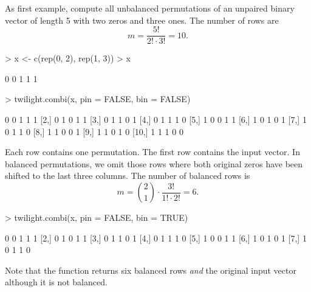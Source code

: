 \documentclass[11pt,a4paper,fleqn]{report}
\begin{document}
As first example, compute all unbalanced permutations of an unpaired binary vector of length 5 with two zeros and three ones. The number of rows are 
\begin{equation}
m = \frac{5!}{2! \cdot 3!} = 10.
\end{equation}
\begin{Schunk}
\begin{Sinput}
> x <- c(rep(0, 2), rep(1, 3))
> x
\end{Sinput}
\begin{Soutput}
[1] 0 0 1 1 1
\end{Soutput}
\end{Schunk}
\begin{Schunk}
\begin{Sinput}
> twilight.combi(x, pin = FALSE, bin = FALSE)
\end{Sinput}
\begin{Soutput}
      [,1] [,2] [,3] [,4] [,5]
 [1,]    0    0    1    1    1
 [2,]    0    1    0    1    1
 [3,]    0    1    1    0    1
 [4,]    0    1    1    1    0
 [5,]    1    0    0    1    1
 [6,]    1    0    1    0    1
 [7,]    1    0    1    1    0
 [8,]    1    1    0    0    1
 [9,]    1    1    0    1    0
[10,]    1    1    1    0    0
\end{Soutput}
\end{Schunk}
Each row contains one permutation. The first row contains the input vector. In balanced permutations, we omit those rows where both original zeros have been shifted to the last three columns. The number of balanced rows is
\begin{equation}
m = {2 \choose 1} \cdot \frac{3!}{1! \cdot 2!} = 6.
\end{equation}
\begin{Schunk}
\begin{Sinput}
> twilight.combi(x, pin = FALSE, bin = TRUE)
\end{Sinput}
\begin{Soutput}
     [,1] [,2] [,3] [,4] [,5]
[1,]    0    0    1    1    1
[2,]    0    1    0    1    1
[3,]    0    1    1    0    1
[4,]    0    1    1    1    0
[5,]    1    0    0    1    1
[6,]    1    0    1    0    1
[7,]    1    0    1    1    0
\end{Soutput}
\end{Schunk}
Note that the function returns six balanced rows \textit{and} the original input vector although it is not balanced.
       
\end{document}
